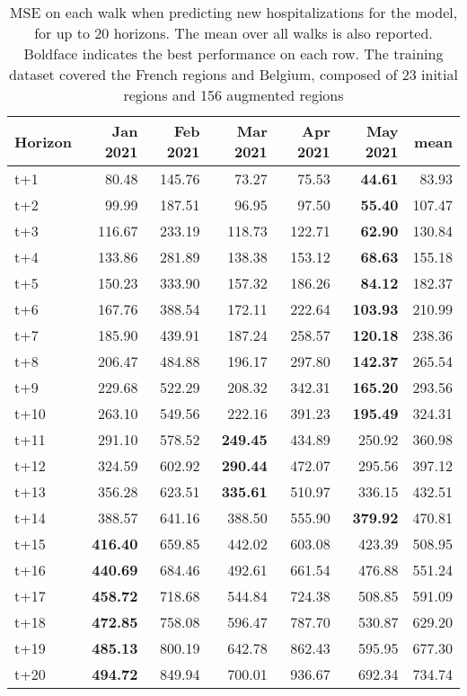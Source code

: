 \begin{table}[H]
\centering
\caption{MSE on each walk when predicting new hospitalizations for the model, for up to 20 horizons. The mean over all walks is also reported. Boldface indicates the best performance on each row. The training dataset covered the French regions and Belgium, composed of 23 initial regions and 156 augmented regions }
\label{tab:MSE_walk_assembly}
\begin{tabular}{lrrrrrr}
\toprule
Horizon &  Jan 2021 &  Feb 2021 &  Mar 2021 &  Apr 2021 &  May 2021 &   mean \\
\midrule
t+1  & 80.48  & 145.76  & 73.27  & 75.53  & \textbf{44.61}  & 83.93  \\
t+2  & 99.99  & 187.51  & 96.95  & 97.50  & \textbf{55.40}  & 107.47  \\
t+3  & 116.67  & 233.19  & 118.73  & 122.71  & \textbf{62.90}  & 130.84  \\
t+4  & 133.86  & 281.89  & 138.38  & 153.12  & \textbf{68.63}  & 155.18  \\
t+5  & 150.23  & 333.90  & 157.32  & 186.26  & \textbf{84.12}  & 182.37  \\
t+6  & 167.76  & 388.54  & 172.11  & 222.64  & \textbf{103.93}  & 210.99  \\
t+7  & 185.90  & 439.91  & 187.24  & 258.57  & \textbf{120.18}  & 238.36  \\
t+8  & 206.47  & 484.88  & 196.17  & 297.80  & \textbf{142.37}  & 265.54  \\
t+9  & 229.68  & 522.29  & 208.32  & 342.31  & \textbf{165.20}  & 293.56  \\
t+10  & 263.10  & 549.56  & 222.16  & 391.23  & \textbf{195.49}  & 324.31  \\
t+11  & 291.10  & 578.52  & \textbf{249.45}  & 434.89  & 250.92  & 360.98  \\
t+12  & 324.59  & 602.92  & \textbf{290.44}  & 472.07  & 295.56  & 397.12  \\
t+13  & 356.28  & 623.51  & \textbf{335.61}  & 510.97  & 336.15  & 432.51  \\
t+14  & 388.57  & 641.16  & 388.50  & 555.90  & \textbf{379.92}  & 470.81  \\
t+15  & \textbf{416.40}  & 659.85  & 442.02  & 603.08  & 423.39  & 508.95  \\
t+16  & \textbf{440.69}  & 684.46  & 492.61  & 661.54  & 476.88  & 551.24  \\
t+17  & \textbf{458.72}  & 718.68  & 544.84  & 724.38  & 508.85  & 591.09  \\
t+18  & \textbf{472.85}  & 758.08  & 596.47  & 787.70  & 530.87  & 629.20  \\
t+19  & \textbf{485.13}  & 800.19  & 642.78  & 862.43  & 595.95  & 677.30  \\
t+20  & \textbf{494.72}  & 849.94  & 700.01  & 936.67  & 692.34  & 734.74  \\

\bottomrule
\end{tabular}
\end{table}
